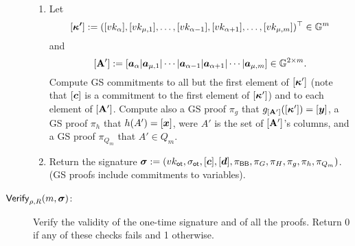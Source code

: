 \begin{description}
\begin{enumerate}
\item Let
$$[{\boldsymbol{\kappa'}}]:=([vk_\alpha],[vk_{\mu,1}],\ldots,[vk_{\alpha-1}],[vk_{\alpha+1}],\ldots,[vk_{\mu,m}])^\top\in\mathbb{G}^m$$ and
$$[\mathbf{{A}}']:=[{\boldsymbol{a}}_\alpha | {\boldsymbol{a}}_{\mu,1} | \cdots | {\boldsymbol{a}}_{\alpha-1}| {\boldsymbol{a}}_{\alpha+1}|\cdots|{\boldsymbol{a}}_{\mu,m}]\in\mathbb{G}^{2\times m}.$$
Compute GS commitments to all but the first element of $[{\boldsymbol{\kappa}}']$ (note that $[{\boldsymbol{c}}]$ is a commitment to the first element of $[{\boldsymbol{\kappa}}']$) and to each element of $[\mathbf{{A}}']$. Compute also a GS proof $\pi_g$ that $g_{[\mathbf{{A}}']}([{\boldsymbol{\kappa}}'])=[{\boldsymbol{y}}]$, a GS proof $\pi_{h}$ that $h(A')=[{\boldsymbol{x}}]$, were $A'$ is the set of $[\mathbf{{A}}']$'s columns, and a GS proof $\pi_{Q_m}$ that $A'\in Q_m$.

\item Return the signature ${\boldsymbol \sigma}:=(vk_\mathsf{ot},\sigma_\mathsf{ot},[{\boldsymbol{c}}],[{\boldsymbol{d}}],\pi_{\mathsf{BB}},\pi_G,\pi_H, \pi_g,\pi_h,\pi_{Q_m})$. (GS proofs include commitments to variables).
\end{enumerate}

\item[$\mathsf{Verify}_{\rho,R}(m,{\boldsymbol \sigma})$:] Verify the validity of the one-time signature and of all the proofs. Return 0 if any of these checks fails and 1 otherwise.
\end{description}

